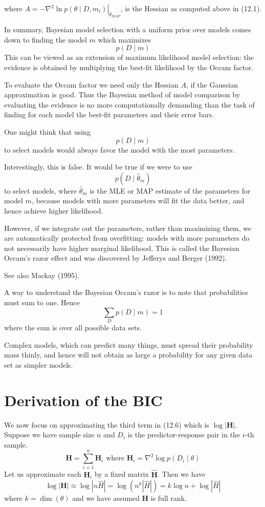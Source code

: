 \documentclass[11pt]{article}
\theoremstyle{plain} %
\theoremstyle{remark}
\begin{document}
where $A=-\left.\nabla^{2} \ln p\left(\theta \mid D,
m_{i}\right)\right|_{\hat{\theta}_{M A P}}$, is the Hessian as computed above in
(12.1).

 In summary, Bayesian model selection with a uniform prior over models
  comes down to finding the model $m$ which maximizes
$$
p(D \mid m)
$$
This can be viewed as an extension of maximum likelihood model
  selection: the evidence is obtained by multiplying the best-fit likelihood by
  the Occam factor.
  
To evaluate the Occam factor we need only the Hessian $A$, if the
  Gaussian approximation is good. Thus the Bayesian method of model comparison by evaluating the evidence
  is no more computationally demanding than the task of finding for each model
  the best-fit parameters and their error bars.

One might think that using
$$
p(D \mid m)
$$
to select models would always favor the model with the most parameters.

Interestingly, this is false. It would be true if we were to use
$$
p\left(D \mid \hat{\theta}_{m}\right)
$$
to select models, where $\hat{\theta}_{m}$ is the MLE or MAP estimate of the
parameters for model $m$, because models with more parameters will fit the data
better, and hence achieve higher likelihood.

However, if we integrate out the parameters, rather than maximizing
  them, we are automatically protected from overfitting: models with more
  parameters do not necessarily have higher marginal likelihood. This is called the Bayesian Occam's razor effect and was discovered by
  Jefferys and Berger (1992).

See also Mackay (1995).

A way to understand the Bayesian Occam's razor is to note that
  probabilities must sum to one. Hence
$$
\sum_{D} p(D \mid m)=1
$$
where the sum is over all possible data sets.

Complex models, which can predict many things, must spread their
  probability mass thinly, and hence will not obtain as large a probability for
  any given data set as simpler models.

\section{Derivation of the BIC}
We now focus on approximating the third term in (12.6) which is $\log
  |\boldsymbol{H}|$. Suppose we have sample size $n$ and $D_{i}$ is the predictor-response
  pair in the $i$-th sample. 
$$
\boldsymbol{H}=\sum_{i=1}^{n} \boldsymbol{H}_{i} \text { where } \boldsymbol{H}_{i}=\nabla^{2} \log p\left(D_{i} \mid \theta\right)
$$
Let us approximate each $\boldsymbol{H}_{i}$ by a fixed matrix
  $\hat{\boldsymbol{H}}$. Then we have
$$
\log |\boldsymbol{H}| \approx \log |n \hat{H}|=\log \left(n^{k}|\hat{H}|\right)=k \log n+\log |\hat{H}|
$$
where $k=\operatorname{dim}(\theta)$ and we have assumed $\boldsymbol{H}$ is
full rank.
\end{document}
